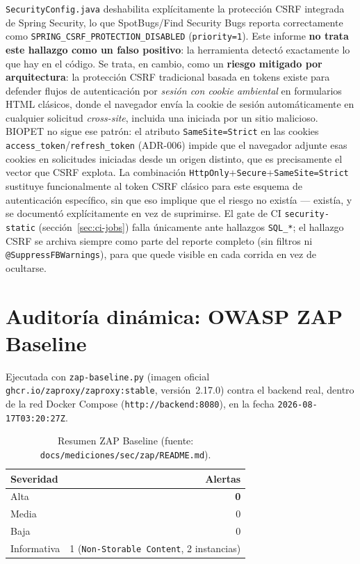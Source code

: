 \texttt{SecurityConfig.java} deshabilita expl\'icitamente la protecci\'on
CSRF integrada de Spring Security, lo que SpotBugs/Find Security Bugs
reporta correctamente como \texttt{SPRING\_CSRF\_PROTECTION\_DISABLED}
(\texttt{priority=1}). Este informe \textbf{no trata este hallazgo como un
falso positivo}: la herramienta detect\'o exactamente lo que hay en el
c\'odigo. Se trata, en cambio, como un \textbf{riesgo mitigado por
arquitectura}: la protecci\'on CSRF tradicional basada en tokens existe
para defender flujos de autenticaci\'on por \emph{sesi\'on con cookie
ambiental} en formularios HTML cl\'asicos, donde el navegador env\'ia la
cookie de sesi\'on autom\'aticamente en cualquier solicitud
\emph{cross-site}, incluida una iniciada por un sitio malicioso. BIOPET no
sigue ese patr\'on: el atributo \texttt{SameSite=Strict} en las cookies
\texttt{access\_token}/\texttt{refresh\_token} (ADR-006) impide que el
navegador adjunte esas cookies en solicitudes iniciadas desde un origen
distinto, que es precisamente el vector que CSRF explota. La combinaci\'on
\texttt{HttpOnly}+\texttt{Secure}+\texttt{SameSite=Strict} sustituye
funcionalmente al token CSRF cl\'asico para este esquema de autenticaci\'on
espec\'ifico, sin que eso implique que el riesgo no exist\'ia --- exist\'ia,
y se document\'o expl\'icitamente en vez de suprimirse. El gate de CI
\texttt{security-static} (secci\'on~\ref{sec:ci-jobs}) falla \'unicamente
ante hallazgos \texttt{SQL\_*}; el hallazgo CSRF se archiva siempre como
parte del reporte completo (sin filtros ni \texttt{@SuppressFBWarnings}),
para que quede visible en cada corrida en vez de ocultarse.

\section{Auditor\'ia din\'amica: OWASP ZAP Baseline}
\label{sec:zap}

Ejecutada con \texttt{zap-baseline.py} (imagen oficial
\texttt{ghcr.io/zaproxy/zaproxy:stable}, versi\'on~2.17.0) contra el
backend real, dentro de la red Docker Compose (\texttt{http://backend:8080}),
en la fecha \texttt{2026-08-17T03:20:27Z}.

\begin{table}[H]
  \centering
  \caption{Resumen ZAP Baseline (fuente: \texttt{docs/mediciones/sec/zap/README.md}).}
  \label{tab:zap-final}
  \begin{tabular}{@{}lr@{}}
    \toprule
    Severidad & Alertas \\
    \midrule
    Alta & \textbf{0} \\
    Media & 0 \\
    Baja & 0 \\
    Informativa & 1 (\texttt{Non-Storable Content}, 2 instancias) \\
    \bottomrule
  \end{tabular}
\end{table}

